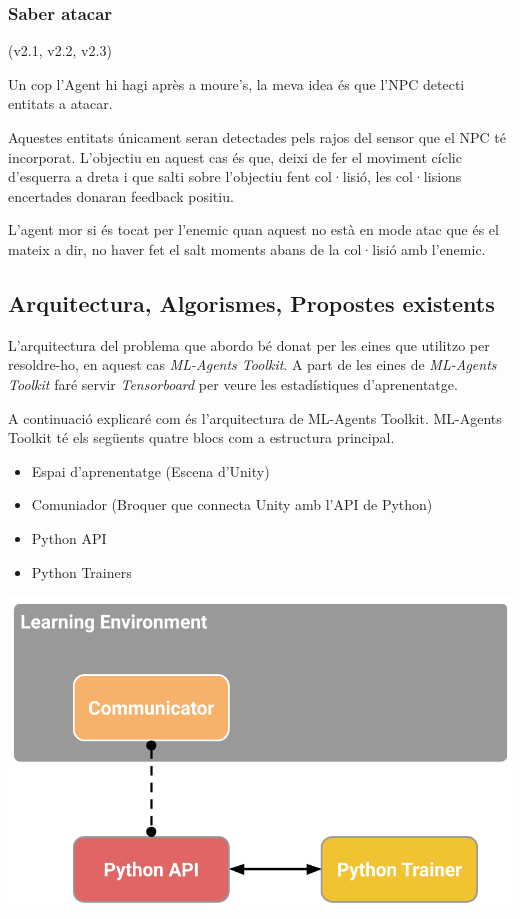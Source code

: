 \documentclass{article}
\begin{document}
    \subsubsection{Saber atacar}
    
    (v2.1, v2.2, v2.3)
    
    Un cop l'Agent hi hagi après a moure's, la meva idea és que l'NPC detecti entitats a atacar.
    
    Aquestes entitats únicament seran detectades pels rajos del sensor que el NPC té incorporat. L'objectiu en aquest cas és que, deixi de fer el moviment cíclic d'esquerra a dreta i que salti sobre l'objectiu fent col·lisió, les col·lisions encertades donaran feedback positiu.
    
    L'agent mor si és tocat per l'enemic quan aquest no està en mode atac que és el mateix a dir, no haver fet el salt moments abans de la col·lisió amb l'enemic.


    \newpage
    
    \subsection{Arquitectura, Algorismes, Propostes existents}
    
    L'arquitectura del problema que abordo bé donat per les eines que utilitzo per resoldre-ho, en aquest cas \textit{ML-Agents Toolkit}. A part de les eines de \textit{ML-Agents Toolkit} faré servir \textit{Tensorboard} per veure les estadístiques d'aprenentatge.

    A continuació explicaré com és l'arquitectura de ML-Agents Toolkit. ML-Agents Toolkit té els següents quatre blocs com a estructura principal.
    
    \begin{itemize}
        \item Espai d'aprenentatge (Escena d'Unity)
        \item Comuniador (Broquer que connecta Unity amb l'API de Python)
        \item Python API
        \item Python Trainers
    \end{itemize}

    \includegraphics[width=\textwidth]{images/learning_environment_basic.png}
    
\end{document}
